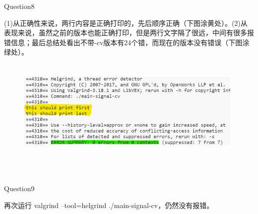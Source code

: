 \documentclass[11pt]{article}
\begin{document}
\begin{large}
	\noindent Question8\\
\end{large}
\hspace*{2em}(1)从正确性来说，两行内容是正确打印的，先后顺序正确（下图涂黄处）。(2)从表现来说，虽然之前的版本也能正确打印，但是两行文字隔了很远，中间有很多报错信息；最后总结处看出不带-cv版本有24个错，而现在的版本没有错误（下图涂绿处）。
\begin{figure}[h]
    \includegraphics[width=11cm,height=5cm]{p7-4.jpg}
    \centering
\end{figure}\\

\begin{large}
	\noindent Question9\\
\end{large}
\hspace*{2em}再次运行 valgrind --tool=helgrind ./main-signal-cv，仍然没有报错。\\
\end{document}
